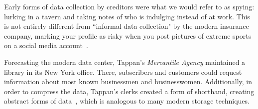 Early forms of data collection by creditors were what we would refer to as
spying: lurking in a tavern and taking notes of who is indulging instead of at
work. This is not entirely different from ``informal data collection" by the
modern insurance company, marking your profile as risky when you post pictures
of extreme sports on a social media account~\cite{naic2012}.

Forecasting the modern data center, Tappan's \textit{Mercantile Agency}
maintained a library in its New York office. There, subscribers and customers
could request information about most known businessmen and businesswomen.
Additionally, in order to compress the data, Tappan's clerks created a form of
shorthand, creating abstract forms of data~\cite{lauer2017creditworthy}, which
is analogous to many modern storage techniques.

